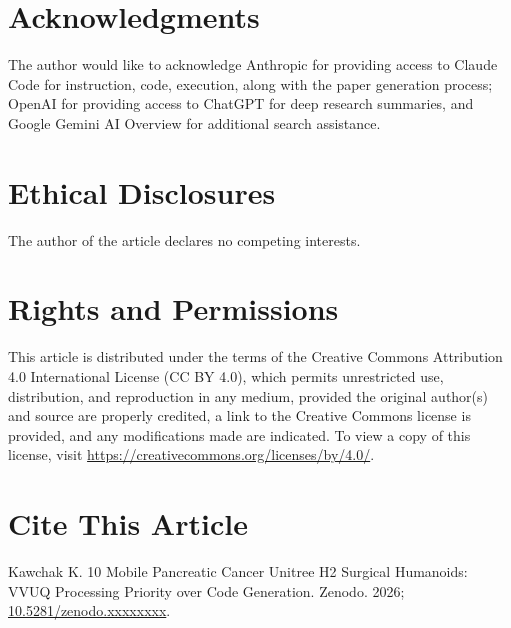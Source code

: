
{}
\section*{Acknowledgments}
\label{sec:acknowledgments}

The author would like to acknowledge Anthropic for providing access to Claude
Code for instruction, code, execution, along with the paper generation process;
OpenAI for providing access to ChatGPT for deep research summaries, and Google
Gemini AI Overview for additional search assistance.

{}
\section*{Ethical Disclosures}
\label{sec:ethics}

The author of the article declares no competing interests.

{}
\section*{Rights and Permissions}
\label{sec:rights}

This article is distributed under the terms of the Creative Commons Attribution
4.0 International License (CC BY 4.0), which permits unrestricted use,
distribution, and reproduction in any medium, provided the original author(s) and
source are properly credited, a link to the Creative Commons license is provided,
and any modifications made are indicated. To view a copy of this license, visit
\url{https://creativecommons.org/licenses/by/4.0/}.

{}
\section*{Cite This Article}
\label{sec:cite}

Kawchak K. 10 Mobile Pancreatic Cancer Unitree H2 Surgical Humanoids: VVUQ
Processing Priority over Code Generation. Zenodo. 2026;
\href{https://doi.org/10.5281/zenodo.xxxxxxxx}{10.5281/zenodo.xxxxxxxx}.

